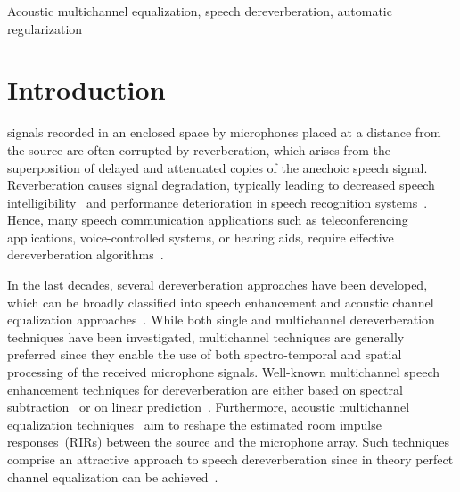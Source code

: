 \documentclass[10pt]{IEEEtran}
\begin{document}
\begin{IEEEkeywords}
Acoustic multichannel equalization, speech dereverberation, automatic regularization
\end{IEEEkeywords}


\section{Introduction}
 signals recorded in an enclosed space by microphones placed at a distance from the source are often corrupted by reverberation, which arises from the superposition of delayed and attenuated copies of the anechoic speech signal.
Reverberation causes signal degradation, typically leading to decreased speech intelligibility~\cite{Houtgast_1985,Beutelmann_2006} and performance deterioration in speech recognition systems~\cite{Omologo_1998, Sehr_phd, Maas_ICASSP_2012}.
Hence, many speech communication applications such as teleconferencing applications, voice-controlled systems, or hearing aids, require effective dereverberation algorithms~\cite{Sehr_phd,Jeub_ITASP_2010,Maas_ICASSP_2012}.

In the last decades, several dereverberation approaches have been developed, which can be broadly classified into speech enhancement and acoustic channel equalization approaches~\cite{Naylor_Derev_book}.
While both single and multichannel dereverberation techniques have been investigated, multichannel techniques are generally preferred since they enable the use of both spectro-temporal and spatial processing of the received microphone signals.
Well-known multichannel speech enhancement techniques for dereverberation are either based on spectral subtraction~\cite{Habets_ITASLP_2008,Habets_ICASSP_2007} or on linear prediction~\cite{Gaubitch_JASA_2006,Delcroix_2007,Nakatani_ITASLP_2010}.
Furthermore, acoustic multichannel equalization techniques~\cite{Miyoshi_ITASS_1988,Kallinger_ICASSP_2006, Hikichi_EURASIP_2007, Mertins_ITASLP_2010, Zhang_IWAENC_2010, Haque_ITASLP_2011, Kodrasi_ICASSP_2012} aim to reshape the estimated room impulse responses~(RIRs) between the source and the microphone array.
Such techniques comprise an attractive approach to speech dereverberation since in theory perfect channel equalization can be achieved~\cite{Miyoshi_ITASS_1988, Hacihabibouglu_ITASLP_2012}.
\end{document}
